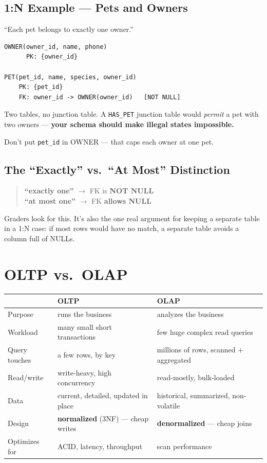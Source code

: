 \documentclass[12pt]{article}
\begin{document}
\subsection*{1:N Example --- Pets and Owners}

``Each pet belongs to exactly one owner.''

\begin{lstlisting}[style=plainschema]
OWNER(owner_id, name, phone)
      PK: {owner_id}

PET(pet_id, name, species, owner_id)
    PK: {pet_id}
    FK: owner_id -> OWNER(owner_id)   [NOT NULL]
\end{lstlisting}

Two tables, no junction table. A \texttt{HAS\_PET} junction table would
\emph{permit} a pet with two owners --- \textbf{your schema should make illegal
states impossible.}

Don't put \texttt{pet\_id} in OWNER --- that caps each owner at one pet.

\subsection*{The ``Exactly'' vs.\ ``At Most'' Distinction}

\begin{quote}
\textbf{``exactly one''} $\to$ FK is \textbf{NOT NULL} \\
\textbf{``at most one''} $\to$ FK \textbf{allows NULL}
\end{quote}

Graders look for this. It's also the one real argument for keeping a separate
table in a 1:N case: if most rows would have no match, a separate table avoids
a column full of NULLs.

\section{OLTP vs.\ OLAP}

\begin{table}[H]
\centering
\begin{tabular}{|l|l|l|}
\hline
 & \textbf{OLTP} & \textbf{OLAP} \\
\hline
Purpose & runs the business & analyzes the business \\
Workload & many small short transactions & few huge complex read queries \\
Query touches & a few rows, by key & millions of rows, scanned + aggregated \\
Read/write & write-heavy, high concurrency & read-mostly, bulk-loaded \\
Data & current, detailed, updated in place & historical, summarized, non-volatile \\
Design & \textbf{normalized} (3NF) --- cheap writes & \textbf{denormalized} --- cheap joins \\
Optimizes for & ACID, latency, throughput & scan performance \\
\hline
\end{tabular}
\end{table}
\end{document}
